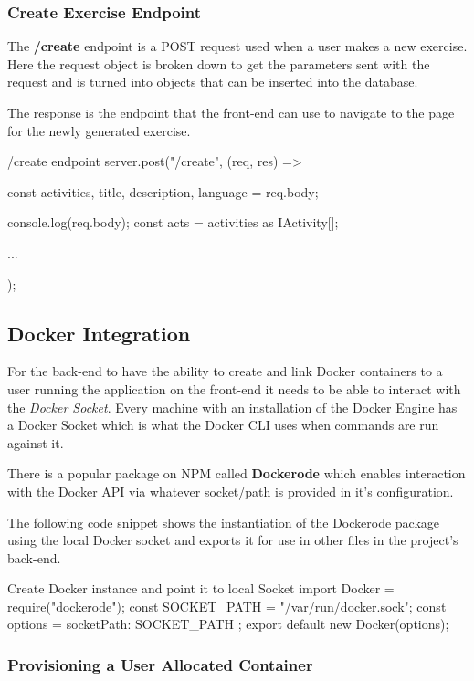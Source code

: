 \subsubsection{Create Exercise Endpoint}

The \textbf{/create} endpoint is a POST request used when a user makes a new exercise. Here the request object is broken down to get the parameters sent with the request and is turned into objects that can be inserted into the database.

The response is the endpoint that the front-end can use to navigate to the page for the newly generated exercise.

\begin{sexylisting}{/create endpoint}
server.post("/create", (req, res) => {
    const { activities, title, description, language } 
        = req.body;

    console.log(req.body);
    const acts = activities as IActivity[];
    
    {...}
});
\end{sexylisting}

\subsection{Docker Integration} \label{impl-docker}

For the back-end to have the ability to create and link Docker containers to a user running the application on the front-end it needs to be able to interact with the \textit{Docker Socket}. Every machine with an installation of the Docker Engine has a Docker Socket which is what the Docker CLI uses when commands are run against it.

There is a popular package on NPM called \textbf{Dockerode} \cite{dockerode} which enables interaction with the Docker API via whatever socket/path is provided in it's configuration.

The following code snippet shows the instantiation of the Dockerode package using the local Docker socket and exports it for use in other files in the project's back-end.

\begin{sexylisting}{Create Docker instance and point it to local Socket}    
import Docker = require("dockerode");
const SOCKET_PATH = "/var/run/docker.sock";
const options = { socketPath: SOCKET_PATH };
export default new Docker(options);
\end{sexylisting}

\subsubsection{Provisioning a User Allocated Container} \label{impl-alloc}

